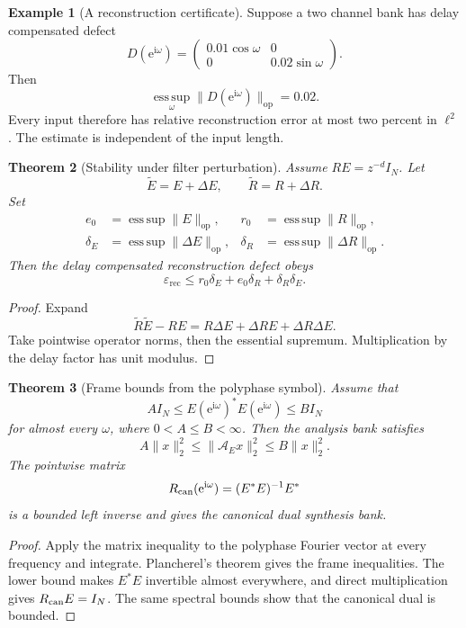\documentclass[11pt,a4paper]{article}
\newtheorem{theorem}{Theorem}[section]
\theoremstyle{definition}
\newtheorem{example}[theorem]{Example}
\theoremstyle{remark}
\newcommand{\ii}{\mathrm i}
\newcommand{\Acal}{\mathcal A}
\newcommand{\esssup}{\operatorname*{ess\,sup}}
\newcommand{\e}{\mathrm e}
\begin{document}
\begin{example}[A reconstruction certificate]\label{ex:reconstruction_certificate}
Suppose a two channel bank has delay compensated defect
\[
D(\e^{\ii\omega})
=
\begin{pmatrix}
0.01\cos\omega&0\\
0&0.02\sin\omega
\end{pmatrix}.
\]
Then
\[
\esssup_\omega\|D(\e^{\ii\omega})\|_{\mathrm{op}}
=0.02.
\]
Every input therefore has relative reconstruction error at most two percent in \(\ell^2\). The estimate is independent of the input length.
\end{example}

\begin{theorem}[Stability under filter perturbation]\label{thm:filter_perturbation}
Assume \(RE=z^{-d}I_N\). Let
\[
\widetilde E=E+\Delta E,
\qquad
\widetilde R=R+\Delta R.
\]
Set
\[
\begin{aligned}
e_0&=\esssup\|E\|_{\mathrm{op}},
& r_0&=\esssup\|R\|_{\mathrm{op}},\\
\delta_E&=\esssup\|\Delta E\|_{\mathrm{op}},
& \delta_R&=\esssup\|\Delta R\|_{\mathrm{op}}.
\end{aligned}
\]
Then the delay compensated reconstruction defect obeys
\[
\varepsilon_{\mathrm{rec}}
\leq
r_0\delta_E+e_0\delta_R+\delta_R\delta_E.
\]
\end{theorem}

\begin{proof}
Expand
\[
\widetilde R\widetilde E-RE
=
R\Delta E+\Delta R E+\Delta R\Delta E.
\]
Take pointwise operator norms, then the essential supremum. Multiplication by the delay factor has unit modulus.
\end{proof}

\begin{theorem}[Frame bounds from the polyphase symbol]\label{thm:frame_bounds}
Assume that
\[
A I_N
\leq
E(\e^{\ii\omega})^*E(\e^{\ii\omega})
\leq
B I_N
\]
for almost every \(\omega\), where \(0<A\leq B<\infty\). Then the analysis bank satisfies
\[
A\|x\|_2^2
\leq
\|\Acal_E x\|_2^2
\leq
B\|x\|_2^2.
\]
The pointwise matrix
\[
R_{\rm can}(\e^{\ii\omega})
=
(E^*E)^{-1}E^*
\]
is a bounded left inverse and gives the canonical dual synthesis bank.
\end{theorem}

\begin{proof}
Apply the matrix inequality to the polyphase Fourier vector at every frequency and integrate. Plancherel's theorem gives the frame inequalities. The lower bound makes \(E^*E\) invertible almost everywhere, and direct multiplication gives \(R_{\rm can}E=I_N\). The same spectral bounds show that the canonical dual is bounded.
\end{proof}
\end{document}
